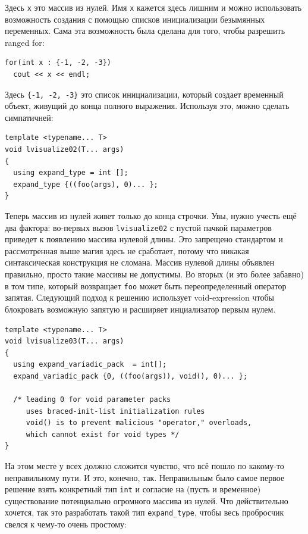 \documentclass[a4paper,12pt,oneside]{article}
\begin{document}
Здесь \lstinline!x! это массив из нулей. Имя \lstinline!x! кажется здесь лишним и можно использовать возможность создания с помощью списков инициализации безымянных переменных. Сама эта возможность была сделана для того, чтобы разрешить ranged for:

\begin{lstlisting}
for(int x : {-1, -2, -3})
  cout << x << endl;
\end{lstlisting}

Здесь \lstinline!{-1, -2, -3}! это список инициализации, который создает временный объект, живущий до конца полного выражения. Используя это, можно сделать симпатичней:

\begin{lstlisting}
template <typename... T>
void lvisualize02(T... args)
{
  using expand_type = int [];
  expand_type {((foo(args), 0)... };
}
\end{lstlisting}

Теперь массив из нулей живет только до конца строчки. Увы, нужно учесть ещё два фактора: во-первых вызов \lstinline!lvisualize02! с пустой пачкой параметров приведет к появлению массива нулевой длины. Это запрещено стандартом и рассмотренная выше магия здесь не сработает, потому что никакая синтаксическая конструкция не сломана. Массив нулевой длины объявлен правильно, просто такие массивы не допустимы. Во вторых (и это более забавно) в том типе, который возвращает \lstinline!foo! может быть переопределенный оператор запятая. Следующий подход к решению использует void-expression чтобы блокровать возможную запятую и расширяет инциализатор первым нулем.

\begin{lstlisting}
template <typename... T>
void lvisualize03(T... args)
{
  using expand_variadic_pack  = int[];
  expand_variadic_pack {0, ((foo(args)), void(), 0)... };

  /* leading 0 for void parameter packs
     uses braced-init-list initialization rules
     void() is to prevent malicious "operator," overloads, 
     which cannot exist for void types */
}
\end{lstlisting}

На этом месте у всех должно сложится чувство, что всё пошло по какому-то неправильному пути. И это, конечно, так. Неправильным было самое первое решение взять конкретный тип \lstinline!int! и согласие на (пусть и временное) существование потенциально огромного массива из нулей. Что действительно хочется, так это разработать такой тип \lstinline!expand_type!, чтобы весь пробросчик свелся к чему-то очень простому:
\end{document}
